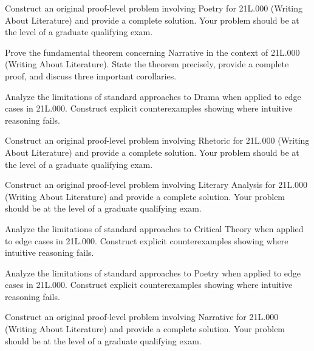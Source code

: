 \documentclass[12pt,a4paper]{exam}
\begin{document}
\begin{questions}
\vspace{0.3cm}

\question[3]
Construct an original proof-level problem involving Poetry for 21L.000 (Writing About Literature) and provide a complete solution. Your problem should be at the level of a graduate qualifying exam.

\vspace{0.3cm}

\question[4]
Prove the fundamental theorem concerning Narrative in the context of 21L.000 (Writing About Literature). State the theorem precisely, provide a complete proof, and discuss three important corollaries.

\vspace{0.3cm}

\question[3]
Analyze the limitations of standard approaches to Drama when applied to edge cases in 21L.000. Construct explicit counterexamples showing where intuitive reasoning fails.

\vspace{0.3cm}

\question[2]
Construct an original proof-level problem involving Rhetoric for 21L.000 (Writing About Literature) and provide a complete solution. Your problem should be at the level of a graduate qualifying exam.

\vspace{0.3cm}

\question[5]
Construct an original proof-level problem involving Literary Analysis for 21L.000 (Writing About Literature) and provide a complete solution. Your problem should be at the level of a graduate qualifying exam.

\vspace{0.3cm}

\question[5]
Analyze the limitations of standard approaches to Critical Theory when applied to edge cases in 21L.000. Construct explicit counterexamples showing where intuitive reasoning fails.

\vspace{0.3cm}

\question[4]
Analyze the limitations of standard approaches to Poetry when applied to edge cases in 21L.000. Construct explicit counterexamples showing where intuitive reasoning fails.

\vspace{0.3cm}

\question[3]
Construct an original proof-level problem involving Narrative for 21L.000 (Writing About Literature) and provide a complete solution. Your problem should be at the level of a graduate qualifying exam.


\end{questions}
\end{document}
